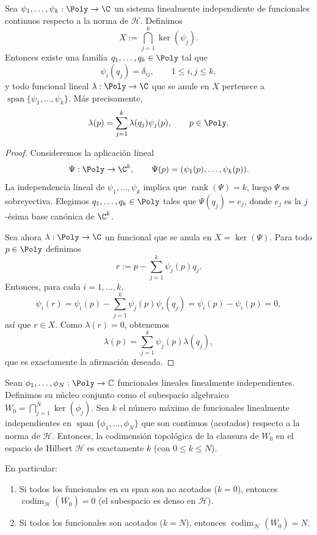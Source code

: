 \begin{lem}\label{lem:anulador_interseccion_nucleos_continuos}
	Sea $\psi_1,\dots,\psi_k:\Poly\to\C$ un sistema linealmente independiente de funcionales continuos respecto a la norma de $\mathcal H$. Definimos
	\[
		X:=\bigcap_{j=1}^k\ker(\psi_j).
	\]
	Entonces existe una familia $q_1,\dots,q_k\in\Poly$ tal que
	\[
		\psi_i(q_j)=\delta_{ij},\qquad 1\le i,j\le k,
	\]
	y todo funcional lineal $\lambda:\Poly\to\C$ que se anule en $X$ pertenece a $\operatorname{span}\{\psi_1,\dots,\psi_k\}$. Más precisamente,
	\[
		\lambda(p)=\sum_{j=1}^k \lambda(q_j)\psi_j(p),\qquad p\in\Poly.
	\]
\end{lem}

\begin{proof}
	Consideremos la aplicación lineal
	\[
		\Psi:\Poly\to\C^k,
		\qquad
		\Psi(p)=(\psi_1(p),\dots,\psi_k(p)).
	\]
	La independencia lineal de $\psi_1,\dots,\psi_k$ implica que $\operatorname{rank}(\Psi)=k$, luego $\Psi$ es sobreyectiva. Elegimos $q_1,\dots,q_k\in\Poly$ tales que $\Psi(q_j)=e_j$, donde $e_j$ es la $j$-ésima base canónica de $\C^k$.

	Sea ahora $\lambda:\Poly\to\C$ un funcional que se anula en $X=\ker(\Psi)$. Para todo $p\in\Poly$ definimos
	\[
		r:=p-\sum_{j=1}^k \psi_j(p)q_j.
	\]
	Entonces, para cada $i=1,\dots,k$,
	\[
		\psi_i(r)=\psi_i(p)-\sum_{j=1}^k\psi_j(p)\psi_i(q_j)=\psi_i(p)-\psi_i(p)=0,
	\]
	así que $r\in X$. Como $\lambda(r)=0$, obtenemos
	\[
		\lambda(p)=\sum_{j=1}^k \psi_j(p)\lambda(q_j),
	\]
	que es exactamente la afirmación deseada.
\end{proof}

\begin{thm}\label{thm:dicotomia_N_general}
	Sean $\phi_1, \dots, \phi_N : \Poly \to \mathbb{C}$ funcionales lineales linealmente independientes. Definimos su núcleo conjunto como el subespacio algebraico $W_0 = \bigcap_{j=1}^N \ker(\phi_j)$.
	Sea $k$ el número máximo de funcionales linealmente independientes en $\operatorname{span}\{\phi_1, \dots, \phi_N\}$ que son continuos (acotados) respecto a la norma de $\mathcal{H}$.
	Entonces, la codimensión topológica de la clausura de $W_0$ en el espacio de Hilbert $\mathcal{H}$ es exactamente $k$ (con $0 \le k \le N$).

	En particular:
	\begin{enumerate}
		\item Si todos los funcionales en su span son no acotados ($k=0$), entonces $\operatorname{codim}_\mathcal{H}(\overline{W_0}) = 0$ (el subespacio es denso en $\mathcal{H}$).
		\item Si todos los funcionales son acotados ($k=N$), entonces $\operatorname{codim}_\mathcal{H}(\overline{W_0}) = N$.
	\end{enumerate}
\end{thm}

